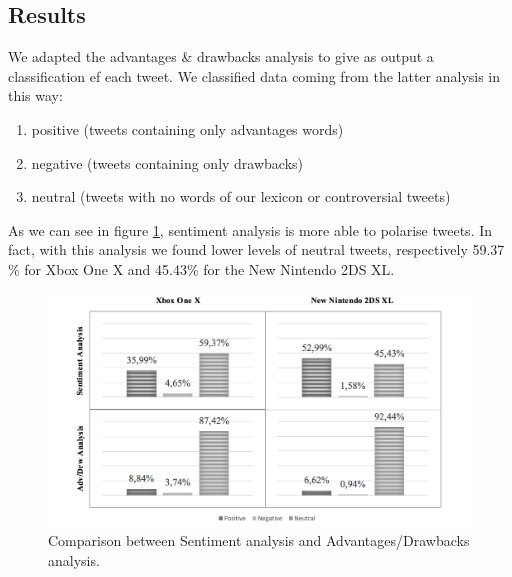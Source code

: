 \documentclass[]{book}
\providecommand{\tightlist}{%
  \setlength{\itemsep}{0pt}\setlength{\parskip}{0pt}}
\begin{document}
\subsection{Results}\label{results-9}

We adapted the advantages \& drawbacks analysis to give as output a
classification ef each tweet. We classified data coming from the latter
analysis in this way:

\begin{enumerate}
\def\labelenumi{\arabic{enumi}.}
\tightlist
\item
  positive (tweets containing only advantages words)
\item
  negative (tweets containing only drawbacks)
\item
  neutral (tweets with no words of our lexicon or controversial tweets)
\end{enumerate}

As we can see in figure \ref{fig:tweetsentres}, sentiment analysis is
more able to polarise tweets. In fact, with this analysis we found lower
levels of neutral tweets, respectively 59.37 \% for Xbox One X and
45.43\% for the New Nintendo 2DS XL.

\begin{figure}

{\centering \includegraphics[width=1\linewidth]{_bookdown_files/figures/tweet_sent_res} 

}

\caption{Comparison between Sentiment analysis and Advantages/Drawbacks analysis.}\label{fig:tweetsentres}
\end{figure}
\end{document}
